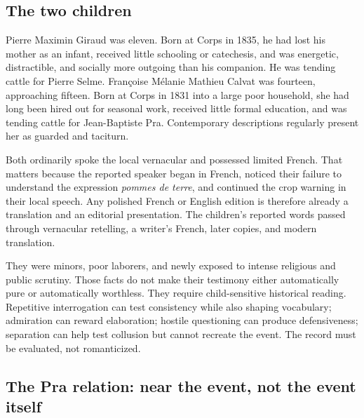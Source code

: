 \subsection{The two children}

Pierre Maximin Giraud was eleven. Born at Corps in 1835, he had lost his mother as an infant, received little schooling or catechesis, and was energetic, distractible, and socially more outgoing than his companion. He was tending cattle for Pierre Selme. Françoise Mélanie Mathieu Calvat was fourteen, approaching fifteen. Born at Corps in 1831 into a large poor household, she had long been hired out for seasonal work, received little formal education, and was tending cattle for Jean-Baptiste Pra. Contemporary descriptions regularly present her as guarded and taciturn.

Both ordinarily spoke the local vernacular and possessed limited French. That matters because the reported speaker began in French, noticed their failure to understand the expression \emph{pommes de terre}, and continued the crop warning in their local speech. Any polished French or English edition is therefore already a translation and an editorial presentation. The children's reported words passed through vernacular retelling, a writer's French, later copies, and modern translation.

They were minors, poor laborers, and newly exposed to intense religious and public scrutiny. Those facts do not make their testimony either automatically pure or automatically worthless. They require child-sensitive historical reading. Repetitive interrogation can test consistency while also shaping vocabulary; admiration can reward elaboration; hostile questioning can produce defensiveness; separation can help test collusion but cannot recreate the event. The record must be evaluated, not romanticized.


\subsection{The Pra relation: near the event, not the event itself}

